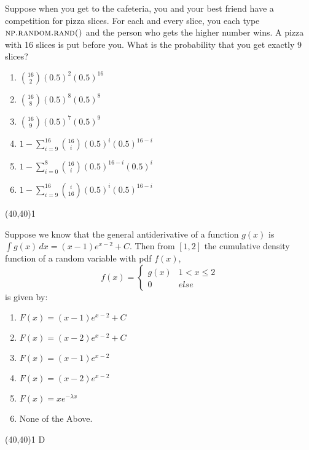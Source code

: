 \documentclass[addpoints]{exam}
\def\solutions{0}
\begin{document}
{\begin{questions}
\question[3] Suppose when you get to the cafeteria, you and your best friend have a competition for pizza slices. For each and every slice, you each type $\textsc{np.random.rand()}$ and the person who gets the higher number wins. A pizza with 16 slices is put before you.  What is the probability that you get exactly 9 slices?

\vspace{2mm}
\begin{minipage}[b]{.85\textwidth}
	\begin{enumerate}[label=\Alph*.]
		\item $ \displaystyle {16 \choose 2} (0.5)^2 (0.5)^16 $
		\item $ \displaystyle {16 \choose 8} (0.5)^8 (0.5)^8 $
		\item $ \displaystyle {16 \choose 9} (0.5)^7 (0.5)^9 $
		\item $ \displaystyle 1 - \sum_{i=9}^{16} {16 \choose i}(0.5)^i(0.5)^{16-i} $
		\item $ \displaystyle 1-\sum_{i=0}^8 {16 \choose i} (0.5)^{16-i} (0.5)^i $
		\item $ \displaystyle 1- \sum_{i=9}^{16} {i \choose 16}(0.5)^i(0.5)^{16-i}$
	\end{enumerate}
\end{minipage}
\begin{minipage}[b]{.1\textwidth}
	\vspace{\fill}\framebox(40,40){\if\solutions1 \fi}
\end{minipage}

\question[3] Suppose we know that the general antiderivative of a function $g(x)$ is $\int g(x) \, dx = (x-1)e^{x-2}+C$.  Then from $[1,2]$ the cumulative density function of a random variable with pdf $f(x)$, $$f(x)=\begin{cases}
g(x) & 1<x \leq 2\\
0 & else
\end{cases}$$
is given by:
\vspace{2mm}

\begin{minipage}[b]{.85\textwidth}
	\begin{enumerate}[label=\Alph*.]
		\item $F(x) = (x-1)e^{x-2}+C$
		\item $F(x) = (x-2)e^{x-2}+C$
		\item $F(x) = (x-1)e^{x-2}$
		\item $F(x) = (x-2)e^{x-2}$
		\item $F(x) = x e^{-\lambda x}$
		\item None of the Above.
	\end{enumerate}
\end{minipage}
\begin{minipage}[b]{.1\textwidth}
	\vspace{\fill}\framebox(40,40){\if\solutions1 D \fi}
\end{minipage}
\vspace{3mm}


\end{questions}}
\end{document}
